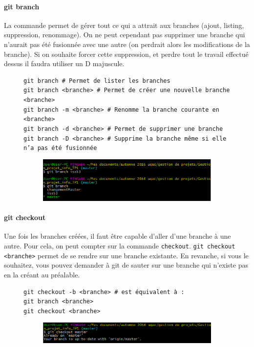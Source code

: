 \documentclass[11pt,canadien]{article}
\begin{document}
\paragraph{git branch}La commande permet de gérer tout ce qui a attrait aux branches (ajout, listing, suppression, renommage). On ne peut cependant  pas supprimer une branche qui n'aurait pas été fusionnée avec une autre (on perdrait alors les modifications de la branche). Si on souhaite forcer cette suppression, et perdre tout le travail effectué dessus il faudra utiliser un D majuscule.
\begin{figure}[H]
	\texttt{git branch               \# Permet de lister les branches \\
			git branch <branche>     \# Permet de créer une nouvelle branche <branche> \\
			git branch -m <branche>  \# Renomme la branche courante en <branche> \\
			git branch -d <branche>  \# Permet de supprimer une branche \\
			git branch -D <branche>  \# Supprime la branche même si elle n'a pas été fusionnée
	}
	\begin{figure}[H]
		\centering
		\includegraphics{images/git_branch.png}
	\end{figure}
\end{figure}

\paragraph{git checkout}Une fois les branches créées, il faut être capable d'aller d'une branche à une autre. Pour cela, on peut compter sur la commande \texttt{checkout}. \texttt{git checkout <branche>} permet de se rendre sur une branche existante. En revanche, si vous le souhaitez, vous pouvez demander à git de sauter sur une branche qui n'existe pas en la créant au préalable.
\begin{figure}[H]
	\texttt{git checkout -b <branche> \# est équivalent à : \\
		    git branch <branche> \\
			git checkout <branche>}
	\begin{figure}[H]
		\centering
		\includegraphics{images/git_checkout.png}
	\end{figure}
\end{figure}
\end{document}
